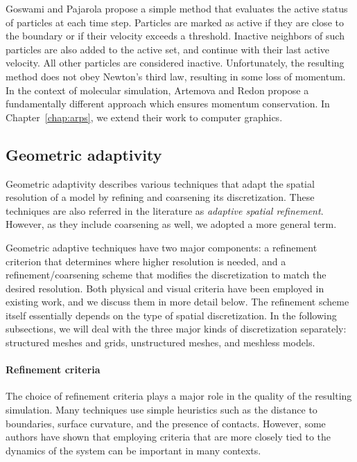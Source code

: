 Goswami and Pajarola \cite{Goswami2011} propose a simple method that evaluates the active status of particles at each time step.
Particles are marked as active if they are close to the boundary or if their velocity exceeds a threshold.
Inactive neighbors of such particles are also added to the active set, and continue with their last active velocity.
All other particles are considered inactive.
Unfortunately, the resulting method does not obey Newton's third law, resulting in some loss of momentum.
In the context of molecular simulation, Artemova and Redon \cite{Artemova2012} propose a fundamentally different approach which ensures momentum conservation. In Chapter~\ref{chap:arps}, we extend their work to computer graphics.

\subsection{Geometric adaptivity} 
\label{sec:spatial_refinement}

Geometric adaptivity describes various techniques that adapt the spatial resolution of a model by refining and coarsening its discretization. These techniques are also referred in the literature as \emph{adaptive spatial refinement}. However, as they include coarsening as well, we adopted a more general term.

Geometric adaptive techniques have two major components: a refinement criterion that determines where higher resolution is needed, and a refinement/coarsening scheme that modifies the discretization to match the desired resolution.
Both physical and visual criteria have been employed in existing work, and we discuss them in more detail below.
The refinement scheme itself essentially depends on the type of spatial discretization.
In the following subsections, we will deal with the three major kinds of discretization separately: structured meshes and grids, unstructured meshes, and meshless models.


\paragraph*{Refinement criteria}
The choice of refinement criteria plays a major role in the quality of the resulting simulation.
Many techniques use simple heuristics such as the distance to boundaries, surface curvature, and the presence of contacts.
However, some authors have shown that employing criteria that are more closely tied to the dynamics of the system can be important in many contexts.

